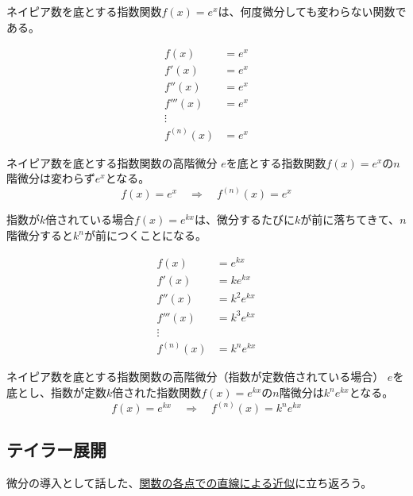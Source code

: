 \documentclass[../../math-imaging]{subfiles}
\begin{document}
ネイピア数を底とする指数関数$f(x)=e^x$は、何度微分しても変わらない関数である。

\begin{align}
  f(x)       & = e^x \\
  f'(x)      & = e^x \\
  f''(x)     & = e^x \\
  f'''(x)    & = e^x \\
  \vdots     &       \\
  f^{(n)}(x) & = e^x
\end{align}

\begin{theorem}{ネイピア数を底とする指数関数の高階微分}
  \newline
  $e$を底とする指数関数$f(x) = e^x$の$n$階微分は変わらず$e^x$となる。
  \LARGE
  \begin{equation}
    f(x) = e^{x} \quad \Longrightarrow \quad f^{(n)}(x) = e^{x}
  \end{equation}
\end{theorem}

指数が$k$倍されている場合$f(x)=e^{kx}$は、微分するたびに$k$が前に落ちてきて、$n$階微分すると$k^n$が前につくことになる。

\begin{align}
  f(x)       & = e^{kx}     \\
  f'(x)      & = ke^{kx}    \\
  f''(x)     & = k^2 e^{kx} \\
  f'''(x)    & = k^3 e^{kx} \\
  \vdots     &              \\
  f^{(n)}(x) & = k^ne^{kx}
\end{align}

\begin{theorem}{ネイピア数を底とする指数関数の高階微分（指数が定数倍されている場合）}
  \newline
  $e$を底とし、指数が定数$k$倍された指数関数$f(x) = e^{kx}$の$n$階微分は$k^n e^{kx}$となる。
  \LARGE
  \begin{equation}
    f(x) = e^{kx} \quad \Longrightarrow \quad f^{(n)}(x) = k^n e^{kx}
  \end{equation}
\end{theorem}

\subsection{テイラー展開}

微分の導入として話した、\hyperref[theorem:関数の各点での直線による近似]{関数の各点での直線による近似}に立ち返ろう。
\end{document}
